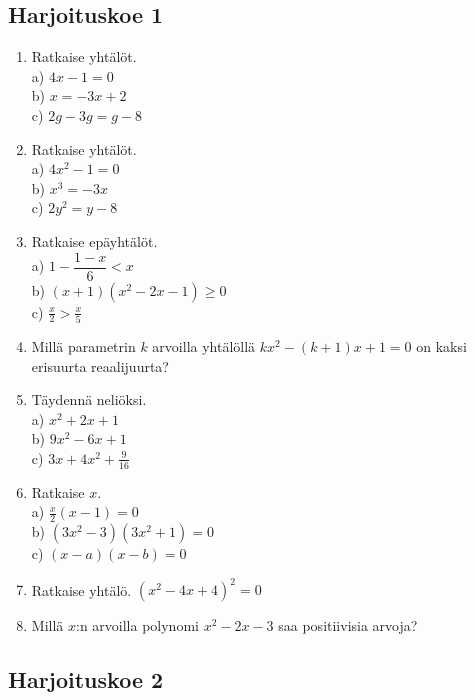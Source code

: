 \subsection*{Harjoituskoe 1}

\begin{enumerate}
\item Ratkaise yhtälöt.\\ a) $4x-1=0$\\ b) $x=-3x+2$\\ c) $2g-3g=g-8$
\item Ratkaise yhtälöt.\\ a) $4x^2-1=0$\\ b) $x^3=-3x$\\ c) $2y^2=y-8$
\item Ratkaise epäyhtälöt.\\ a) $1-\dfrac{1-x}{6}<x$\\ b) $(x+1)(x^2-2x-1)\geq0$\\ c) $\frac{x}{2}>\frac{x}{5}$
\item Millä parametrin $k$ arvoilla yhtälöllä $kx^2-(k+1)x+1=0$ on kaksi erisuurta reaalijuurta?
\item Täydennä neliöksi. \\ a) $x^2+2x+1$\\ b) $9x^2-6x+1$\\ c) $3x+4x^2+\frac{9}{16}$
\item Ratkaise $x$. \\ a) $\frac{x}{2}(x-1)=0$\\ b) $(3x^2-3)(3x^2+1)=0$\\ c) $(x-a)(x-b)=0$
\item Ratkaise yhtälö. $(x^2-4x+4)^2=0$
\item Millä $x$:n arvoilla polynomi $x^2-2x-3$ saa positiivisia arvoja?

\end{enumerate}

\subsection*{Harjoituskoe 2}

